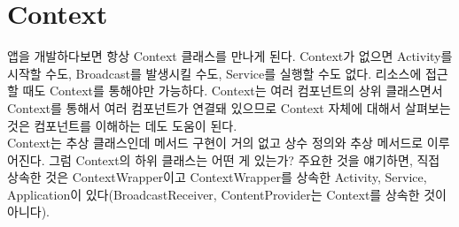 \chapter{Context}
앱을 개발하다보면 항상 Context 클래스를 만나게 된다. 
Context가 없으면 Activity를 시작할 수도, Broadcast를 발생시킬 수도, Service를 실행할 수도 없다. 
리소스에 접근할 때도 Context를 통해야만 가능하다.
Context는 여러 컴포넌트의 상위 클래스면서 Context를 통해서 여러 컴포넌트가 연결돼 있으므로   Context 자체에 대해서 살펴보는 것은 컴포넌트를 이해하는 데도 도움이 된다.\\

Context는 추상 클래스인데 메서드 구현이 거의 없고 상수 정의와 추상 메서드로 이루어진다. 
그럼 Context의 하위 클래스는 어떤 게 있는가? 주요한 것을 얘기하면, 직접 상속한 것은 ContextWrapper이고 ContextWrapper를 상속한 Activity, Service, Application이 있다(BroadcastReceiver, ContentProvider는 Context를 상속한 것이 아니다).\\

